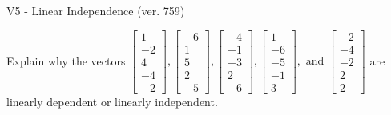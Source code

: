 \begin{exercise}
  \begin{exerciseTitle}V5 - Linear Independence (ver. 759)\end{exerciseTitle}
  \begin{exerciseStatement}
    Explain why the vectors \(\left[\begin{array}{r}
1 \\
-2 \\
4 \\
-4 \\
-2
\end{array}\right] , \left[\begin{array}{r}
-6 \\
1 \\
5 \\
2 \\
-5
\end{array}\right] , \left[\begin{array}{r}
-4 \\
-1 \\
-3 \\
2 \\
-6
\end{array}\right] , \left[\begin{array}{r}
1 \\
-6 \\
-5 \\
-1 \\
3
\end{array}\right] , \text{ and } \left[\begin{array}{r}
-2 \\
-4 \\
-2 \\
2 \\
2
\end{array}\right]\) are linearly dependent or linearly independent.	



\end{exerciseStatement}
\end{exercise}
